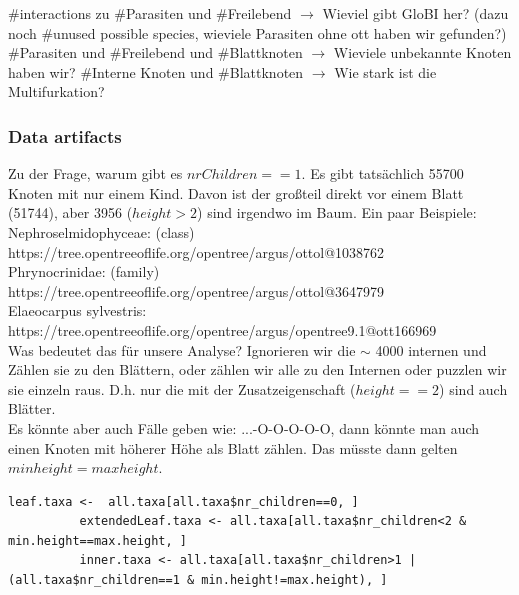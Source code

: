       \#interactions zu \#Parasiten und \#Freilebend $\rightarrow$ Wieviel gibt GloBI her? (dazu noch 
        \#unused possible species, wieviele Parasiten ohne ott haben wir gefunden?)
      \#Parasiten und \#Freilebend und \#Blattknoten $\rightarrow$ Wieviele unbekannte Knoten haben wir?
      \#Interne Knoten und \#Blattknoten $\rightarrow$ Wie stark ist die Multifurkation?
      \subsubsection{Data artifacts}
        Zu der Frage, warum gibt es $nrChildren==1$. Es gibt tatsächlich 55700 Knoten mit nur einem Kind. 
          Davon ist der großteil direkt vor einem Blatt (51744), aber 3956 ($height >2$) sind irgendwo im 
          Baum. Ein paar Beispiele: \\
        Nephroselmidophyceae: (class) \\
        https://tree.opentreeoflife.org/opentree/argus/ottol@1038762 \\
        Phrynocrinidae: (family) \\
        https://tree.opentreeoflife.org/opentree/argus/ottol@3647979 \\
        Elaeocarpus sylvestris: \\
        https://tree.opentreeoflife.org/opentree/argus/opentree9.1@ott166969 \\
        Was bedeutet das für unsere Analyse? Ignorieren wir die $\sim$ 4000 internen und Zählen sie zu den 
          Blättern, oder zählen wir alle zu den Internen oder puzzlen wir sie einzeln raus. D.h. nur die 
          mit der Zusatzeigenschaft ($height == 2$) sind auch Blätter. \\
        Es könnte aber auch Fälle geben wie: ...-O-O-O-O-O, dann könnte man auch einen Knoten mit höherer 
          Höhe als Blatt zählen. Das müsste dann gelten $min height = max height$. \\ 
        \begin{lstlisting}[gobble=8]
          leaf.taxa <-  all.taxa[all.taxa$nr_children==0, ]
          extendedLeaf.taxa <- all.taxa[all.taxa$nr_children<2 & min.height==max.height, ]
          inner.taxa <- all.taxa[all.taxa$nr_children>1 | (all.taxa$nr_children==1 & min.height!=max.height), ]
        \end{lstlisting}

